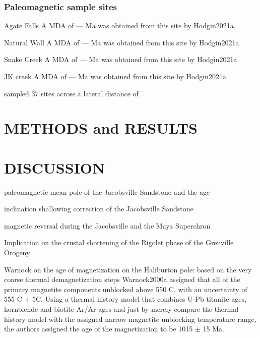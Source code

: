 \documentclass[11pt,letterpaper]{article}
\begin{document}
\subsubsection{Paleomagnetic sample sites}
Agate Falls
A MDA of --- Ma was obtained from this site by Hodgin2021a. 

Natural Wall
A MDA of --- Ma was obtained from this site by Hodgin2021a

Snake Creek
A MDA of --- Ma was obtained from this site by Hodgin2021a

JK creek
A MDA of --- Ma was obtained from this site by Hodgin2021a



\cite{Roy1978a} sampled 37 sites across a lateral distance of 




\section*{METHODS and RESULTS}



\section*{DISCUSSION}

paleomagnetic mean pole of the Jacobsville Sandstone and the age

inclination shallowing correction of the Jacobsville Sandstone

magnetic reversal during the Jacobsville and the Maya Superchron

Implication on the crustal shortening of the Rigolet phase of the Grenville Orogeny

Warnock on the age of magnetization on the Haliburton pole: based on the very coarse thermal demagnetization steps Warnock2000a assigned that all of the primary magnetite components unblocked above 550 \textdegree C, with an uncertainty of 555 \textdegree C $\pm$ 5\textdegree C. Using a thermal history model that combines U-Pb titanite ages, hornblende and biotite Ar/Ar ages and just by merely compare the thermal history model with the assigned narrow magnetite unblocking temperature range, the authors assigned the age of the magnetization to be 1015 $\pm$ 15 Ma. 
\end{document}
